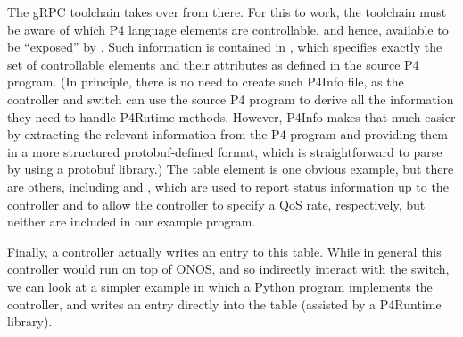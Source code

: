 \documentclass[letterpaper,11pt,english]{sphinxmanual}
\begin{document}
The gRPC toolchain takes over from there. For this to work, the
toolchain must be aware of which P4 language elements are
controllable, and hence, available to be “exposed” by
. Such information is contained in
, which specifies exactly the set of controllable
elements and their attributes as defined in the source P4 program. (In
principle, there is no need to create such P4Info file, as the
controller and switch can use the source P4 program to derive all the
information they need to handle P4Rutime methods. However, P4Info
makes that much easier by extracting the relevant information from the
P4 program and providing them in a more structured protobuf-defined
format, which is straightforward to parse by using a protobuf
library.) The table element is one obvious example, but there are
others, including  and , which are used to
report status information up to the controller and to allow the
controller to specify a QoS rate, respectively, but neither are
included in our example program.

Finally, a controller actually writes an entry to this table. While in
general this controller would run on top of ONOS, and so indirectly
interact with the switch, we can look at a simpler example in which a
Python program implements the controller, and writes an entry directly
into the table (assisted by a P4Runtime library).

\begin{sphinxVerbatim}[commandchars=\\\{\}]
 
  
          
         
         
\end{sphinxVerbatim}
\end{document}
